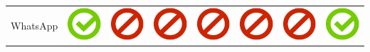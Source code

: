 \documentclass[10pt,foldmark,tumble]{leaflet}
\begin{document}
{{\begin{tabular}{ L{2cm} | C{2cm} | C{2cm} | C{2cm} | C{2cm} | C{2cm} | C{2cm} | C{2cm} | }
WhatsApp & \includegraphics[scale=0.1]{pics/haken.png} & \includegraphics[scale=0.1]{pics/nohaken.png} & \includegraphics[scale=0.1]{pics/nohaken.png} & \includegraphics[scale=0.1]{pics/nohaken.png} & \includegraphics[scale=0.1]{pics/nohaken.png} & \includegraphics[scale=0.1]{pics/nohaken.png} & \includegraphics[scale=0.1]{pics/haken.png} \tabularnewline

\end{tabular}}}
\end{document}
